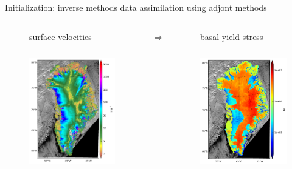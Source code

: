 \documentclass[hide notes,intlimits]{beamer}
\begin{document}
\begin{frame}{Initialization: inverse methods}
  data assimilation using adjont methods
  \begin{columns}[c]
    \begin{column}{.46\textwidth}
      \begin{figure}
        \alert{surface velocities} \\
        \includegraphics[height=6cm]{greenland-sar}
      \end{figure}
    \end{column}
    \begin{column}{.04\textwidth}
      \alert{\Large $\Rightarrow$}
    \end{column}
    \begin{column}{.46\textwidth}
      \begin{figure}
        \alert{basal yield stress} \\ 
        \includegraphics[height=6cm]{tauc}
      \end{figure}
    \end{column}
  \end{columns}
\end{frame}
\end{document}
